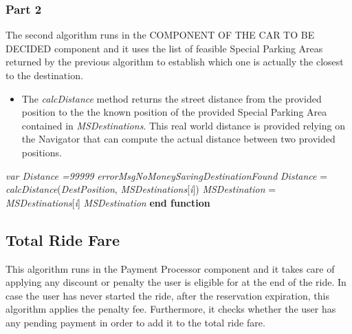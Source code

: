 \subsubsection{Part 2}

The second algorithm runs in the COMPONENT OF THE CAR TO BE DECIDED component and it uses the list of feasible Special Parking Areas returned by the previous algorithm to establish which one is actually the closest to the destination.

\begin{itemize}
    \item The \textit{calcDistance} method returns the street distance from the provided position to the the known position of the provided Special Parking Area contained in \textit{MSDestinations}. This real world distance is provided relying on the Navigator that can compute the actual distance between two provided positions.
\end{itemize}

\begin{algorithm}
\caption{}\label{euclid}
\begin{algorithmic}[1]
\State \textit{var Distance =99999}
\State\Return \textit{errorMsgNoMoneySavingDestinationFound}
\EndIf
{}
\State \textit{Distance} = \textit{calcDistance}(\textit{DestPosition}, \textit{MSDestinations}[\textit{i}])
\State \textit{MSDestination} = \textit{MSDestinations}[\textit{i}]
\EndIf
\EndFor
\State\Return \textit{MSDestination}
\EndFunction
\State \textbf{end function}
\end{algorithmic}
\end{algorithm}

\newpage


\subsection{Total Ride Fare}
This algorithm runs in the Payment Processor component and it takes care of applying any discount or penalty the user is eligible for at the end of the ride. In case the user has never started the ride, after the reservation expiration, this algorithm applies the penalty fee. Furthermore, it checks whether the user has any pending payment in order to add it to the total ride fare.

